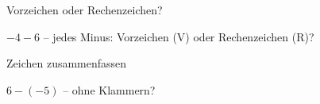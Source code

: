 \setcounter{aufgabe}{12}

\begin{aufgabe}{Vorzeichen oder Rechenzeichen?}
\begin{teile}
\teil $-4 - 6$ – jedes Minus: Vorzeichen (V) oder Rechenzeichen (R)? \leerfeld
\end{teile}
\end{aufgabe}

\begin{aufgabe}{Zeichen zusammenfassen}
\begin{teile}
\teil $6 - (-5)$ – ohne Klammern? \leerfeld
\end{teile}
\end{aufgabe}

